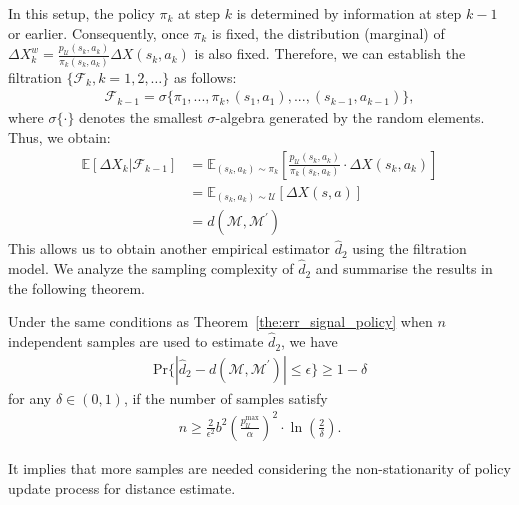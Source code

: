 In this setup, the policy $\pi_{k}$ at step $k$ is determined by information at step $k-1$ or earlier. Consequently, once $\pi_k$ is fixed, the distribution (marginal) of $\Delta X^w_k = \frac{p_\mathcal{U}(s_k, a_k)}{\pi_{k}(s_k, a_k)}\Delta X(s_k, a_k)$ is also fixed. Therefore, we can establish the filtration $\{\mathcal{F}_k, k=1,2,\ldots\}$ as follows: 
\begin{equation}
\begin{aligned}
    \mathcal{F}_{k-1} = \sigma\{\pi_1,...,\pi_k,(s_1,a_1),...,(s_{k-1},a_{k-1})\},
\end{aligned}
\end{equation}
where $\sigma\{\cdot\}$ denotes the smallest $\sigma$-algebra generated by the random elements. Thus, we obtain: 
\begin{equation}
\label{eqn:Martingale}
\begin{aligned}
    \mathbb{E}[\Delta X_k|\mathcal{F}_{k-1}] &= \mathbb{E}_{(s_k,a_k)\sim \pi_k} \left[\frac{p_\mathcal{U}(s_k,a_k)}{\pi_k(s_k,a_k)}\cdot \Delta X(s_k, a_k)\right]\\
    & = \mathbb{E}_{(s_k,a_k)\sim \mathcal{U}} [\Delta X(s,a)] \\
    & = d(\mathcal{M},\mathcal{M}^{\prime})
\end{aligned}
\end{equation}
This allows us to obtain another empirical estimator $\hat{d}_{2}$ using the filtration model. We analyze the sampling complexity of $\hat{d}_{2}$ and summarise the results in the following theorem.
\begin{theorem}
\label{the:err_multi_policy}
Under the same conditions as Theorem~\ref{the:err_signal_policy}
when $n$ independent samples are used to estimate $\hat{d}_{2}$, we have
\begin{equation}
\begin{aligned}
\text{Pr}\{|\hat{d}_{2}-d(\mathcal{M},\mathcal{M}^{\prime})|\leq \epsilon\} \geq 1-\delta
\end{aligned}
\end{equation}
for any $\delta \in (0, 1)$, if the number of samples satisfy
\begin{equation}
\begin{aligned}
    n \geq \frac{2}{\epsilon^2} b^2 \left(\frac{p_\mathcal{U}^{\max}}{\alpha}\right)^2\cdot \ln \left(\frac{2}{\delta}\right).
\end{aligned}
\end{equation}
\end{theorem}
It implies that more samples are needed considering the non-stationarity of policy update process for distance estimate.




